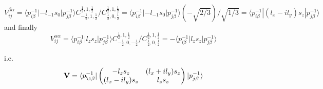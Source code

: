 \documentclass{article}
\begin{document}
\begin{equation}
 V^{\beta\alpha}_{ij}  = \langle p_{i\beta}^{-1}|-l_{-1} s_{0} |p_{j\beta }^{-1}\rangle 
                         C^{\frac 1 2,1,\frac 1 2}_{-\frac 1 2,1,\frac 1 2}/
                         C^{\frac 1 2,1,\frac 1 2}_{\frac 1 2, 0,\frac 1 2}
                       = \langle p_{i\beta}^{-1}|-l_{-1} s_{0} |p_{j\beta }^{-1}\rangle (-\sqrt{2/3})/\sqrt{1/3}
                       = \langle p_{i\beta}^{-1}|(l_x-il_y) s_z |p_{j\beta }^{-1}\rangle
\end{equation}
and finally 
\begin{equation}
 V^{\alpha\alpha}_{ij}  =  \langle p_{i\beta}^{-1}|l_z s_z |p_{j\beta}^{-1}\rangle
                         C^{\frac 1 2,1,\frac 1 2}_{-\frac 1 2, 0,-\frac 1 2}/
                         C^{\frac 1 2,1,\frac 1 2}_{\frac 1 2, 0,\frac 1 2}
 = - \langle p_{i\beta}^{-1}|l_z s_z |p_{j\beta}^{-1}\rangle
\end{equation}

i.e.
\begin{equation}
 \mathbf{V}  =
    \langle 
        p_{\i\beta}^{-1}  |
         \begin{pmatrix} 
            -l_z s_z &(l_x + i l_y)s_z \\
            (l_x-il_y)s_z & l_z s_z
        \end{pmatrix}
        | p_{j\beta}^{-1}
    \rangle 
\end{equation}
\end{document}
